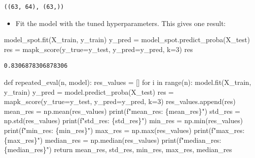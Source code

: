 \documentclass[
  letterpaper,
  DIV=11,
  numbers=noendperiod]{scrreprt}
\newenvironment{Shaded}{\begin{snugshade}}{\end{snugshade}}
\newcommand{\BuiltInTok}[1]{\textcolor[rgb]{0.00,0.23,0.31}{#1}}
\newcommand{\ControlFlowTok}[1]{\textcolor[rgb]{0.00,0.23,0.31}{#1}}
\newcommand{\DecValTok}[1]{\textcolor[rgb]{0.68,0.00,0.00}{#1}}
\newcommand{\KeywordTok}[1]{\textcolor[rgb]{0.00,0.23,0.31}{#1}}
\newcommand{\NormalTok}[1]{\textcolor[rgb]{0.00,0.23,0.31}{#1}}
\newcommand{\OperatorTok}[1]{\textcolor[rgb]{0.37,0.37,0.37}{#1}}
\newcommand{\SpecialCharTok}[1]{\textcolor[rgb]{0.37,0.37,0.37}{#1}}
\newcommand{\SpecialStringTok}[1]{\textcolor[rgb]{0.13,0.47,0.30}{#1}}
\providecommand{\tightlist}{%
  \setlength{\itemsep}{0pt}\setlength{\parskip}{0pt}}\usepackage{longtable,booktabs,array}
\begin{document}
\begin{verbatim}
((63, 64), (63,))
\end{verbatim}

\begin{itemize}
\tightlist
\item
  Fit the model with the tuned hyperparameters. This gives one result:
\end{itemize}

\begin{Shaded}
\begin{Highlighting}[]
\NormalTok{model\_spot.fit(X\_train, y\_train)}
\NormalTok{y\_pred }\OperatorTok{=}\NormalTok{ model\_spot.predict\_proba(X\_test)}
\NormalTok{res }\OperatorTok{=}\NormalTok{ mapk\_score(y\_true}\OperatorTok{=}\NormalTok{y\_test, y\_pred}\OperatorTok{=}\NormalTok{y\_pred, k}\OperatorTok{=}\DecValTok{3}\NormalTok{)}
\NormalTok{res}
\end{Highlighting}
\end{Shaded}

\begin{verbatim}
0.8306878306878306
\end{verbatim}

\begin{Shaded}
\begin{Highlighting}[]
\KeywordTok{def}\NormalTok{ repeated\_eval(n, model):}
\NormalTok{    res\_values }\OperatorTok{=}\NormalTok{ []}
    \ControlFlowTok{for}\NormalTok{ i }\KeywordTok{in} \BuiltInTok{range}\NormalTok{(n):}
\NormalTok{        model.fit(X\_train, y\_train)}
\NormalTok{        y\_pred }\OperatorTok{=}\NormalTok{ model.predict\_proba(X\_test)}
\NormalTok{        res }\OperatorTok{=}\NormalTok{ mapk\_score(y\_true}\OperatorTok{=}\NormalTok{y\_test, y\_pred}\OperatorTok{=}\NormalTok{y\_pred, k}\OperatorTok{=}\DecValTok{3}\NormalTok{)}
\NormalTok{        res\_values.append(res)}
\NormalTok{    mean\_res }\OperatorTok{=}\NormalTok{ np.mean(res\_values)}
    \BuiltInTok{print}\NormalTok{(}\SpecialStringTok{f"mean\_res: }\SpecialCharTok{\{}\NormalTok{mean\_res}\SpecialCharTok{\}}\SpecialStringTok{"}\NormalTok{)}
\NormalTok{    std\_res }\OperatorTok{=}\NormalTok{ np.std(res\_values)}
    \BuiltInTok{print}\NormalTok{(}\SpecialStringTok{f"std\_res: }\SpecialCharTok{\{}\NormalTok{std\_res}\SpecialCharTok{\}}\SpecialStringTok{"}\NormalTok{)}
\NormalTok{    min\_res }\OperatorTok{=}\NormalTok{ np.}\BuiltInTok{min}\NormalTok{(res\_values)}
    \BuiltInTok{print}\NormalTok{(}\SpecialStringTok{f"min\_res: }\SpecialCharTok{\{}\NormalTok{min\_res}\SpecialCharTok{\}}\SpecialStringTok{"}\NormalTok{)}
\NormalTok{    max\_res }\OperatorTok{=}\NormalTok{ np.}\BuiltInTok{max}\NormalTok{(res\_values)}
    \BuiltInTok{print}\NormalTok{(}\SpecialStringTok{f"max\_res: }\SpecialCharTok{\{}\NormalTok{max\_res}\SpecialCharTok{\}}\SpecialStringTok{"}\NormalTok{)}
\NormalTok{    median\_res }\OperatorTok{=}\NormalTok{ np.median(res\_values)}
    \BuiltInTok{print}\NormalTok{(}\SpecialStringTok{f"median\_res: }\SpecialCharTok{\{}\NormalTok{median\_res}\SpecialCharTok{\}}\SpecialStringTok{"}\NormalTok{)}
    \ControlFlowTok{return}\NormalTok{ mean\_res, std\_res, min\_res, max\_res, median\_res}
\end{Highlighting}
\end{Shaded}
\end{document}
